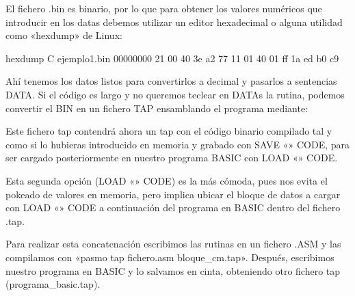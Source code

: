 \documentclass[letterpaper,10pt,spanish]{sphinxmanual}
\begin{document}
\begin{sphinxVerbatim}[commandchars=\\\{\}]
      

                          
\end{sphinxVerbatim}

El fichero .bin es binario, por lo que para obtener los valores numéricos que introducir en los datas debemos utilizar un editor hexadecimal o alguna utilidad como «hexdump» de Linux:

\begin{sphinxVerbatim}[commandchars=\\\{\}]
\PYGZdl{} hexdump \PYGZhy{}C ejemplo1.bin
00000000  21 00 40 3e a2 77 11 01 40 01 ff 1a ed b0 c9
\end{sphinxVerbatim}

Ahí tenemos los datos listos para convertirlos a decimal y pasarlos a sentencias DATA. Si el código es largo y no queremos teclear en DATAs la rutina, podemos convertir el BIN en un fichero TAP ensamblando el programa mediante:

\begin{sphinxVerbatim}[commandchars=\\\{\}]
   
\end{sphinxVerbatim}

Este fichero tap contendrá ahora un tap con el código binario compilado tal y como si lo hubieras introducido en memoria y grabado con SAVE «» CODE, para ser cargado posteriormente en nuestro programa BASIC con LOAD «» CODE.

Esta segunda opción (LOAD «» CODE) es la más cómoda, pues nos evita el pokeado de valores en memoria, pero implica ubicar el bloque de datos a cargar con LOAD «» CODE a continuación del programa en BASIC dentro del fichero .tap.

Para realizar esta concatenación escribimos las rutinas en un fichero .ASM y las compilamos con «pasmo \textendash{}tap fichero.asm bloque\_cm.tap». Después, escribimos nuestro programa en BASIC y lo salvamos en cinta, obteniendo otro fichero tap (programa\_basic.tap).
\end{document}
